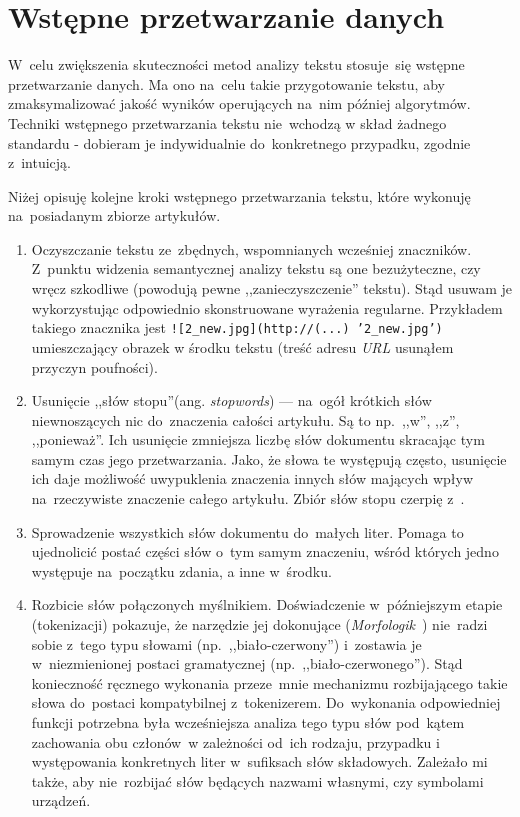 \documentclass[pl]{minipw} %
\begin{document}
\section{Wstępne przetwarzanie danych}

W~celu zwiększenia skuteczności metod analizy tekstu stosuje~się wstępne przetwarzanie danych. Ma ono na~celu takie przygotowanie tekstu, aby zmaksymalizować jakość wyników operujących na~nim później algorytmów. Techniki wstępnego przetwarzania tekstu nie~wchodzą w skład żadnego standardu - dobieram je indywidualnie do~konkretnego przypadku, zgodnie z~intuicją.

Niżej opisuję kolejne kroki wstępnego przetwarzania tekstu, które wykonuję na~posiadanym zbiorze artykułów.
\begin{enumerate}
	\item Oczyszczanie tekstu ze~zbędnych, wspomnianych wcześniej znaczników. Z~punktu widzenia semantycznej analizy tekstu są one bezużyteczne, czy wręcz szkodliwe (powodują pewne ,,zanieczyszczenie'' tekstu). Stąd usuwam je wykorzystując odpowiednio skonstruowane wyrażenia regularne. Przykładem takiego znacznika jest \texttt{![2\_new.jpg](http://(...) '2\_new.jpg')} umieszczający obrazek w środku tekstu (treść adresu \textit{URL} usunąłem przyczyn poufności).
	\item Usunięcie ,,słów stopu''(ang. \textit{stopwords}) --- na~ogół krótkich słów niewnoszących nic do~znaczenia całości artykułu. Są to np.~,,w'', ,,z'', ,,ponieważ''. Ich usunięcie zmniejsza liczbę słów dokumentu skracając tym samym czas jego przetwarzania. Jako, że słowa te występują często, usunięcie ich daje możliwość uwypuklenia znaczenia innych słów mających wpływ na~rzeczywiste znaczenie całego artykułu. Zbiór słów stopu czerpię z~\cite{stopwords}.
\item Sprowadzenie wszystkich słów dokumentu do~małych liter. Pomaga to ujednolicić postać części słów o~tym samym znaczeniu, wśród których jedno występuje na~początku zdania, a inne w~środku.
	\item Rozbicie słów połączonych myślnikiem. Doświadczenie w~późniejszym etapie (tokenizacji) pokazuje, że narzędzie jej dokonujące (\textit{Morfologik}~\cite{morfologik}) nie~radzi sobie z~tego typu słowami (np.~,,biało-czerwony'') i~zostawia je w~niezmienionej postaci gramatycznej (np.~,,biało-czerwonego''). Stąd konieczność ręcznego wykonania przeze~mnie mechanizmu rozbijającego takie słowa do~postaci kompatybilnej z~tokenizerem. Do~wykonania odpowiedniej funkcji potrzebna była wcześniejsza analiza tego typu słów pod~kątem zachowania obu członów~w zależności od~ich rodzaju, przypadku i występowania konkretnych liter w~sufiksach słów składowych. Zależało mi także, aby nie~rozbijać słów będących nazwami własnymi, czy symbolami urządzeń.

\end{enumerate}
\end{document}
